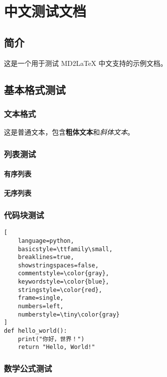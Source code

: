 \documentclass[UTF8, a4paper, 12pt]{ctexart}
\begin{document}
\section{中文测试文档}


\subsection{简介}

这是一个用于测试 MD2LaTeX 中文支持的示例文档。


\subsection{基本格式测试}


\subsubsection{文本格式}

这是普通文本，包含\textbf{粗体文本}和\emph{斜体文本}。


\subsubsection{列表测试}


\paragraph{有序列表}

\paragraph{无序列表}

\subsubsection{代码块测试}


\begin{lstlisting}[
    language=python,
    basicstyle=\ttfamily\small,
    breaklines=true,
    showstringspaces=false,
    commentstyle=\color{gray},
    keywordstyle=\color{blue},
    stringstyle=\color{red},
    frame=single,
    numbers=left,
    numberstyle=\tiny\color{gray}
]
def hello_world():
    print("你好，世界！")
    return "Hello, World!"

\end{lstlisting}


\subsubsection{数学公式测试}
\end{document}
